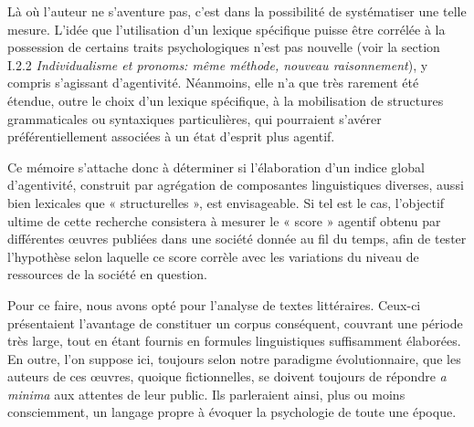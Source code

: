 Là où l’auteur ne s’aventure pas, c’est dans la possibilité de systématiser une telle mesure. L’idée que l’utilisation d’un lexique spécifique puisse être corrélée à la possession de certains traits psychologiques n’est pas nouvelle (voir la section I.2.2 \textit{Individualisme et pronoms: même méthode, nouveau raisonnement}), y compris s’agissant d’agentivité. Néanmoins, elle n’a que très rarement été étendue, outre le choix d'un lexique spécifique, à la mobilisation de structures grammaticales ou syntaxiques particulières, qui pourraient s’avérer préférentiellement associées à un état d’esprit plus agentif.

Ce mémoire s’attache donc à déterminer si l’élaboration d’un indice global d’agentivité, construit par agrégation de composantes linguistiques diverses, aussi bien lexicales que « structurelles », est envisageable. Si tel est le cas, l’objectif ultime de cette recherche consistera à mesurer le « score » agentif obtenu par différentes œuvres publiées dans une société donnée au fil du temps, afin de tester l’hypothèse selon laquelle ce score corrèle avec les variations du niveau de ressources de la société en question.

Pour ce faire, nous avons opté pour l’analyse de textes littéraires. Ceux-ci présentaient l’avantage de constituer un corpus conséquent, couvrant une période très large, tout en étant fournis en formules linguistiques suffisamment élaborées. En outre, l’on suppose ici, toujours selon notre paradigme évolutionnaire, que les auteurs de ces œuvres, quoique fictionnelles, se doivent toujours de répondre \textit{a minima} aux attentes de leur public. Ils parleraient ainsi, plus ou moins consciemment, un langage propre à évoquer la psychologie de toute une époque.